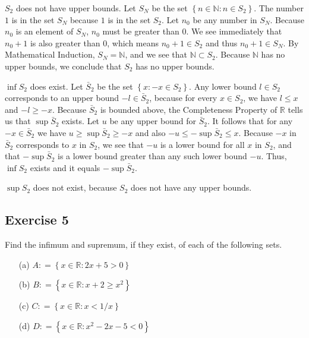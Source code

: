 \documentclass[12pt]{article}
\begin{document}
$S_2$ does not have upper bounds. Let $S_N$ be the set $\left\{n \in \mathbb{N} : n \in S_2\right\}$. The number $1$ is in the set $S_N$ because $1$ is in the set $S_2$. Let $n_0$ be any number in $S_N$. Because $n_0$ is an element of $S_N$, $n_0$ must be greater than $0$. We see immediately that $n_0 + 1$ is also greater than $0$, which means $n_0 + 1 \in S_2$ and thus $n_0 + 1 \in S_N$. By Mathematical Induction, $S_N = \mathbb{N}$, and we see that $\mathbb{N} \subset S_2$. Because $\mathbb{N}$ has no upper bounds, we conclude that $S_2$ has no upper bounds.

$\inf S_2$ does exist. Let $\bar{S}_2$ be the set $\left\{x : -x \in S_2\right\}$. Any lower bound $l \in S_2$ corresponds to an upper bound $-l \in \bar{S}_2$, because for every $x \in S_2$, we have $l \leq x$ and $-l \geq -x$. Because $\bar{S}_2$ is bounded above, the Completeness Property of $\mathbb{R}$ tells us that $\sup \bar{S}_2$ exists. Let $u$ be any upper bound for $\bar{S}_2$. It follows that for any $-x \in \bar{S}_2$ we have $u \geq \sup \bar{S}_2 \geq -x$ and also $-u \leq -\sup\bar{S}_2 \leq x$. Because $-x$ in $\bar{S}_2$ corresponds to $x$ in $S_2$, we see that $-u$ is a lower bound for all $x$ in $S_2$, and that $-\sup\bar{S}_2$ is a lower bound greater than any such lower bound $-u$. Thus, $\inf S_2$ exists and it equals $-\sup\bar{S}_2$.

$\sup S_2$ does not exist, because $S_2$ does not have any upper bounds.

\subsection*{Exercise 5}
Find the infimum and supremum, if they exist, of each of the following sets.
\begin{itemize}
\item[(a)] $A \mathrel{\mathop:}= \left\{x \in \mathbb{R} : 2x + 5 > 0\right\}$
\item[(b)] $B \mathrel{\mathop:}= \left\{x \in \mathbb{R} : x + 2 \geq x^2\right\}$
\item[(c)] $C \mathrel{\mathop:}= \left\{x \in \mathbb{R} : x < 1/x\right\}$
\item[(d)] $D \mathrel{\mathop:}= \left\{x \in \mathbb{R} : x^2 - 2x - 5 < 0\right\}$
\end{itemize}
\end{document}
